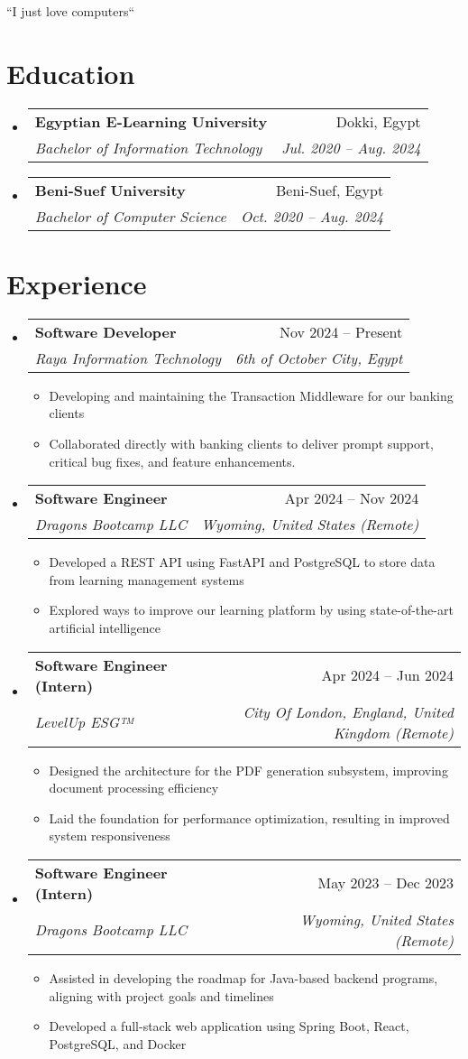 \documentclass[letterpaper,11pt]{article}
\makeatletter
\newcommand{\resumeItem}[1]{
  \item\small{
    {#1 \vspace{-2pt}}
  }
}
\newcommand{\resumeSubheading}[4]{
  \vspace{-2pt}\item
    \begin{tabular*}{0.97\textwidth}[t]{l@{\extracolsep{\fill}}r}
      \textbf{#1} & #2 \\
      \textit{\small#3} & \textit{\small #4} \\
    \end{tabular*}\vspace{-7pt}
}
\newcommand{\resumeSubHeadingListStart}{\begin{itemize}[leftmargin=0.15in, label={}]}
\newcommand{\resumeSubHeadingListEnd}{\end{itemize}}
\newcommand{\resumeItemListStart}{\begin{itemize}}
\newcommand{\resumeItemListEnd}{\end{itemize}\vspace{-5pt}}
\makeatother
\begin{document}
\begin{center}
    ``I just love computers``
\end{center}


\section{Education}
  \resumeSubHeadingListStart
    \resumeSubheading
      {Egyptian E-Learning University}{Dokki, Egypt}
      {Bachelor of Information Technology}{Jul. 2020 -- Aug. 2024}
    \resumeSubheading
      {Beni-Suef University}{Beni-Suef, Egypt}
      {Bachelor of Computer Science}{Oct. 2020 -- Aug. 2024}
  \resumeSubHeadingListEnd


\section{Experience}
   \resumeSubHeadingListStart

    \resumeSubheading
  {Software Developer}{Nov 2024 -- Present}
  {Raya Information Technology}{6th of October City, Egypt}
  \resumeItemListStart
    \resumeItem{Developing and maintaining the Transaction Middleware for our banking clients}
    \resumeItem{Collaborated directly with banking clients to deliver prompt support, critical bug fixes, and feature enhancements.}
  \resumeItemListEnd

     \resumeSubheading
       {Software Engineer}{Apr 2024 -- Nov 2024}
       {Dragons Bootcamp LLC}{Wyoming, United States (Remote)}
       \resumeItemListStart
         \resumeItem{Developed a REST API using FastAPI and PostgreSQL to store data from learning management systems}
         \resumeItem{Explored ways to improve our learning platform by using state-of-the-art artificial intelligence}
       \resumeItemListEnd

       \resumeSubheading
       {Software Engineer (Intern)}{Apr 2024 -- Jun 2024}
       {LevelUp ESG™}{City Of London, England, United Kingdom (Remote)}
       \resumeItemListStart
         \resumeItem{Designed the architecture for the PDF generation subsystem, improving document processing efficiency}
         \resumeItem{Laid the foundation for performance optimization, resulting in improved system responsiveness}
       \resumeItemListEnd

       \resumeSubheading
       {Software Engineer (Intern)}{May 2023 -- Dec 2023}
       {Dragons Bootcamp LLC}{Wyoming, United States (Remote)}
       \resumeItemListStart
         \resumeItem{Assisted in developing the roadmap for Java-based backend programs, aligning with project goals and timelines}
         \resumeItem{Developed a full-stack web application using Spring Boot, React, PostgreSQL, and Docker}
       \resumeItemListEnd
    \resumeSubHeadingListEnd
\end{document}
